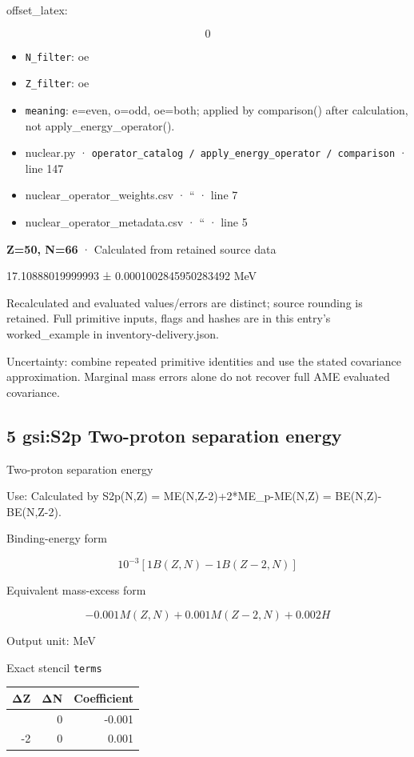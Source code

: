\documentclass[
  11pt,
  letterpaper,
]{article}
\begin{document}
offset\_latex:

\[
0
\]

\begin{itemize}
\item
  \texttt{N\_filter}: oe
\item
  \texttt{Z\_filter}: oe
\item
  \texttt{meaning}: e=even, o=odd, oe=both; applied by comparison()
  after calculation, not apply\_energy\_operator().
\item
  nuclear.py ·
  \texttt{operator\_catalog\ /\ apply\_energy\_operator\ /\ comparison}
  · line 147
\item
  nuclear\_operator\_weights.csv · `` · line 7
\item
  nuclear\_operator\_metadata.csv · `` · line 5
\end{itemize}

\textbf{Z=50, N=66} · Calculated from retained source data

17.10888019999993 ± 0.0001002845950283492 MeV

Recalculated and evaluated values/errors are distinct; source rounding
is retained. Full primitive inputs, flags and hashes are in this entry's
worked\_example in inventory-delivery.json.

Uncertainty: combine repeated primitive identities and use the stated
covariance approximation. Marginal mass errors alone do not recover full
AME evaluated covariance.

\subsection{5 gsi:S2p Two-proton separation
energy}\label{gsis2p-two-proton-separation-energy}

Two-proton separation energy

Use: Calculated by S2p(N,Z) = ME(N,Z-2)+2*ME\_p-ME(N,Z) =
BE(N,Z)-BE(N,Z-2).

Binding-energy form

\[
10^{-3}[1B(Z,N)-1B(Z-2,N)]
\]

Equivalent mass-excess form

\[
-0.001M(Z,N)+0.001M(Z-2,N) + 0.002 H
\]

Output unit: MeV

Exact stencil \texttt{terms}

\begin{longtable}[]{@{}rrr@{}}
\toprule\noalign{}
ΔZ & ΔN & Coefficient \\
\midrule\noalign{}
\endhead
\bottomrule\noalign{}
\endlastfoot
0 & 0 & -0.001 \\
-2 & 0 & 0.001 \\
\end{longtable}
\end{document}
